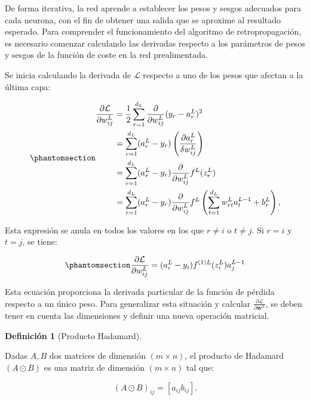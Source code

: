 \documentclass[
  us-letterpaper,
]{scrreprt}
\theoremstyle{plain}
\theoremstyle{definition}
\theoremstyle{plain}
\theoremstyle{definition}
\newtheorem{definition}{Definición}[chapter]
\theoremstyle{remark}
\begin{document}
De forma iterativa, la red aprende a establecer los pesos y sesgos
adecuados para cada neurona, con el fin de obtener una salida que se
aproxime al resultado esperado. Para comprender el funcionamiento del
algoritmo de retropropagación, es necesario comenzar calculando las
derivadas respecto a los parámetros de pesos y sesgos de la función de
coste en la red prealimentada.

Se inicia calculando la derivada de \(\mathcal L\) respecto a uno de los
pesos que afectan a la última capa:

\begin{equation}\phantomsection\label{eq-18}{\begin{split}\frac{\partial \mathcal L}{\partial w_{ij}^L} &= \frac{1}{2} \sum_{r=1}^{d_L} \frac{\partial}{\partial w_{ij}^L} (y_r - a_{r}^L)^2\\
 &= \sum_{r=1}^{d_L} (a_{r}^L - y_r) \left(\frac{\partial a_r^L}{\delta w_{ij}^L}\right)\\
 &=\sum_{r=1}^{d_L} (a_{r}^L - y_r) \frac{\partial}{\partial w_{ij}^L}f^L(z_{r}^L)\\
&= \sum_{r=1}^{d_L} (a_{r}^L - y_r) \frac{\partial}{\partial w_{ij}^L}f^L\left(\sum_{t=1}^{d_L}w_{rt}^La_t^{L-1}+b_r^L\right),\end{split}}\end{equation}

Esta expresión se anula en todos los valores en los que \(r\neq i\) o
\(t\neq j\). Si \(r = i\) y \(t = j\), se tiene:

\begin{equation}\phantomsection\label{eq-retrop}{\frac{\partial \mathcal L}{\partial w_{ij}^L} = (a_{i}^L - y_i) f^{(1)L}(z_{i}^L) a_j^{L-1}}\end{equation}

Esta ecuación proporciona la derivada particular de la función de
pérdida respecto a un único peso. Para generalizar esta situación y
calcular \(\frac{\partial \mathcal L}{\partial \mathbf w^{L}}\), se
deben tener en cuenta las dimensiones y definir una nueva operación
matricial.

\begin{definition}[Producto
Hadamard]\protect\hypertarget{def-pHada}{}\label{def-pHada}

Dadas \(A, B\) dos matrices de dimensión \((m\times n)\), el producto de
Hadamard \((A\odot B)\) es una matriz de dimensión \((m\times n)\) tal
que:

\[
(A\odot B)_{ij}=[a_{ij}b_{ij}].
\]

\end{definition}
\end{document}
